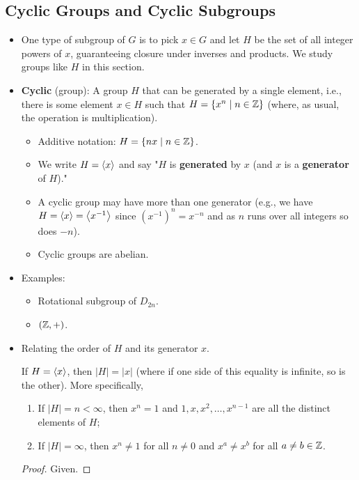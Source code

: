 \documentclass[../notes.tex]{subfiles}
\begin{document}
\subsection*{Cyclic Groups and Cyclic Subgroups}
\begin{itemize}
    \item One type of subgroup of $G$ is to pick $x\in G$ and let $H$ be the set of all integer powers of $x$, guaranteeing closure under inverses and products. We study groups like $H$ in this section.
    \item \textbf{Cyclic} (group): A group $H$ that can be generated by a single element, i.e., there is some element $x\in H$ such that $H=\{x^n\mid n\in\mathbb{Z}\}$ (where, as usual, the operation is multiplication).
    \begin{itemize}
        \item Additive notation: $H=\{nx\mid n\in\mathbb{Z}\}$.
        \item We write $H=\left\langle{x}\right\rangle$ and say "$H$ is \textbf{generated} by $x$ (and $x$ is a \textbf{generator} of $H$)."
        \item A cyclic group may have more than one generator (e.g., we have $H=\left\langle{x}\right\rangle=\left\langle{x^{-1}}\right\rangle$ since $(x^{-1})^n=x^{-n}$ and as $n$ runs over all integers so does $-n$).
        \item Cyclic groups are abelian.
    \end{itemize}
    \item Examples:
    \begin{itemize}
        \item Rotational subgroup of $D_{2n}$.
        \item $(\mathbb{Z},+)$.
    \end{itemize}
    \item Relating the order of $H$ and its generator $x$.
    \begin{proposition}\label{prp:2.2}
        If $H=\left\langle{x}\right\rangle$, then $|H|=|x|$ (where if one side of this equality is infinite, so is the other). More specifically,
        \begin{enumerate}
            \item If $|H|=n<\infty$, then $x^n=1$ and $1,x,x^2,\dots,x^{n-1}$ are all the distinct elements of $H$;
            \item If $|H|=\infty$, then $x^n\neq 1$ for all $n\neq 0$ and $x^a\neq x^b$ for all $a\neq b\in\mathbb{Z}$.
        \end{enumerate}
        \begin{proof}
            Given.
        \end{proof}

\end{proposition}
\end{itemize}
\end{document}
